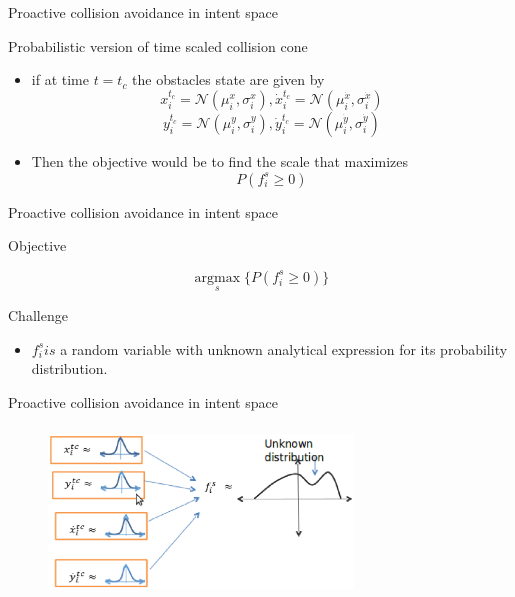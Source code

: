 \documentclass{beamer}
\begin{document}
\begin{frame}{Proactive collision avoidance in intent space}
\begin{block}{Probabilistic version of time scaled collision cone}
\begin{itemize}


\item{if at time $t=t_c$ the obstacles state are given by }
$$x_i^{t_c} = \mathcal{N}(\mu_i^{x},\sigma_i^{x}), \dot{x}_i^{t_c} = \mathcal{N}(\mu_i^{\dot{x}},\sigma_i^{\dot{x}})$$
$$y_i^{t_c} = \mathcal{N}(\mu_i^{y},\sigma_i^{y}), \dot{y}_i^{t_c} = \mathcal{N}(\mu_i^{\dot{y}},\sigma_i^{\dot{y}})$$
\item{Then the objective would be to find the scale that maximizes}
$$P(f_i^s \geq 0)$$ 
\end{itemize} 
\end{block}
\end{frame}
\begin{frame}{Proactive collision avoidance in intent space}
\begin{block}{Objective}

$$\underset{s}{\operatorname{argmax}}\{P(f_i^s \geq 0)\}$$ 

\end{block}
\begin{block}{Challenge}
\begin{itemize}


\item{$f_i^s is$ a random variable with unknown analytical  expression for its probability
 distribution.}
 \end{itemize} 
\end{block}
\end{frame}
\begin{frame}{Proactive collision avoidance in intent space}
\begin{figure}
\includegraphics[width= 8.1cm, height=4.5cm]{fig8.eps}
\end{figure}

\end{frame}
\end{document}
